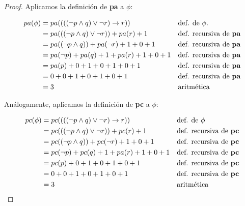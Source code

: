 \documentclass[letterpaper,10pt]{article}
\begin{document}
\begin{enumerate}
\begin{itemize}
            \begin{proof}
                Aplicamos la definición de \textbf{pa} a $\phi$:

                \begin{align*}
                    pa(\phi) 
                    &= pa(((( \neg p \land q) \lor \neg r) \rightarrow r))
                    && \text{def. de $\phi$.} \\
                    &= pa(((\neg p \land q) \lor \neg r)) + pa(r) + 1
                    && \text{def. recursiva de \textbf{pa}} \\
                    &= pa((\neg p \land q)) + pa(\neg r) + 1 + 0 + 1
                    && \text{def. recursiva de \textbf{pa}} \\
                    &= pa(\neg p) + pa(q) + 1 + pa(r) + 1 + 0 + 1
                    && \text{def. recursiva de \textbf{pa}} \\
                    &= pa(p) + 0 + 1 + 0 + 1 + 0 + 1
                    && \text{def. recursiva de \textbf{pa}} \\
                    &= 0 + 0 + 1 + 0 + 1 + 0 + 1
                    && \text{def. recursiva de \textbf{pa}} \\
                    &= 3
                    && \text{aritmética}
                \end{align*}

                Análogamente, aplicamos la definición de \textbf{pc} a $\phi$:
                
                \begin{align*}
                    pc(\phi) 
                    &= pc(((( \neg p \land q) \lor \neg r) \rightarrow r))
                    && \text{def. de $\phi$} \\
                    &= pc(((\neg p \land q) \lor \neg r)) + pc(r) + 1
                    && \text{def. recursiva de \textbf{pc}} \\
                    &= pc((\neg p \land q)) + pc(\neg r) + 1 + 0 + 1
                    && \text{def. recursiva de \textbf{pc}} \\
                    &= pc(\neg p) + pc(q) + 1 + pa(r) + 1 + 0 + 1
                    && \text{def. recursiva de \textbf{pc}} \\
                    &= pc(p) + 0 + 1 + 0 + 1 + 0 + 1
                    && \text{def. recursiva de \textbf{pc}} \\
                    &= 0 + 0 + 1 + 0 + 1 + 0 + 1
                    && \text{def. recursiva de \textbf{pc}} \\
                    &= 3
                    && \text{aritmética}
                \end{align*}


\end{proof}
\end{itemize}
\end{enumerate}
\end{document}

